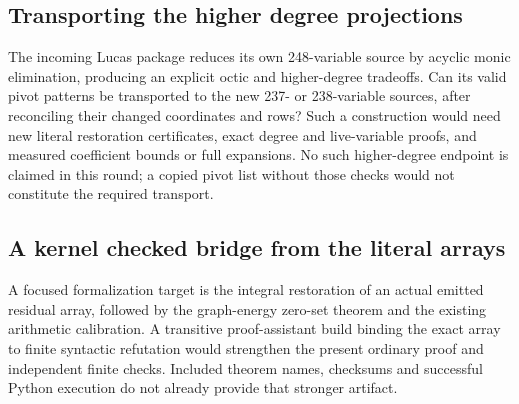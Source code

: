 \subsection{Transporting the higher degree projections}
The incoming Lucas package reduces its own 248-variable source by acyclic
monic elimination, producing an explicit octic and higher-degree tradeoffs.
Can its valid pivot patterns be transported to the new 237- or 238-variable
sources, after reconciling their changed coordinates and rows? Such a
construction would need new literal restoration certificates, exact degree
and live-variable proofs, and measured coefficient bounds or full expansions.
No such higher-degree endpoint is claimed in this round; a copied pivot
list without those checks would not constitute the required transport.

\subsection{A kernel checked bridge from the literal arrays}
A focused formalization target is the integral restoration of an actual
emitted residual array, followed by the graph-energy zero-set theorem and
the existing arithmetic calibration. A transitive proof-assistant build
binding the exact array to finite syntactic refutation would strengthen
the present ordinary proof and independent finite checks. Included theorem
names, checksums and successful Python execution do not already provide
that stronger artifact.
